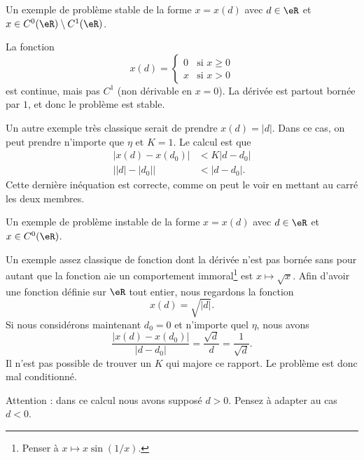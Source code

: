 \begin{example} \label{ExRZrOeoi}
	Un exemple de problème stable de la forme  $x=x(d)$ avec $d\in\eR$ et $x \in C^0(\eR)\setminus C^1(\eR)$.

	La fonction
	\begin{equation}
		x(d)=\begin{cases}
			0   &   \text{si }x\geq 0\\
			x   &   \text{si }x>0
		\end{cases}
	\end{equation}
	est continue, mais pas $C^1$ (non dérivable en $x=0$). La dérivée est partout bornée par $1$, et donc le problème est stable.

	Un autre exemple très classique serait de prendre $x(d)=| d |$. Dans ce cas, on peut prendre n'importe que $\eta$ et $K=1$. Le calcul est que
	\begin{subequations}
		\begin{align}
			| x(d)-x(d_0) |&<K| d-d_0 |\\
			\big| | d |-| d_0 | \big|&<| d-d_0 |.
		\end{align}
	\end{subequations}
	Cette dernière inéquation est correcte, comme on peut le voir en mettant au carré les deux membres.

\end{example}

\begin{example} \label{PIluknK}
	Un exemple de problème instable de la forme $x=x(d)$ avec $d\in\eR$ et $x \in C^0(\eR)$.

	Un exemple assez classique de fonction dont la dérivée n'est pas bornée sans pour autant que la fonction aie un comportement immoral\footnote{Penser à $x\mapsto x\sin(1/x)$.} est $x\mapsto\sqrt{x}$. Afin d'avoir une fonction définie sur $\eR$ tout entier, nous regardons la fonction
	\begin{equation}
		x(d)=\sqrt{|d|}.
	\end{equation}
	Si nous considérons maintenant $d_0=0$ et n'importe quel $\eta$, nous avons
	\begin{equation}
		\frac{ | x(d)-x(d_0) | }{ | d-d_0 | }=\frac{ \sqrt{d} }{ d }=\frac{1}{ \sqrt{d} }.
	\end{equation}
	Il n'est pas possible de trouver un $K$ qui majore ce rapport. Le problème est donc mal conditionné.

	Attention : dans ce calcul nous avons supposé $d>0$. Pensez à adapter au cas $d<0$.
\end{example}

